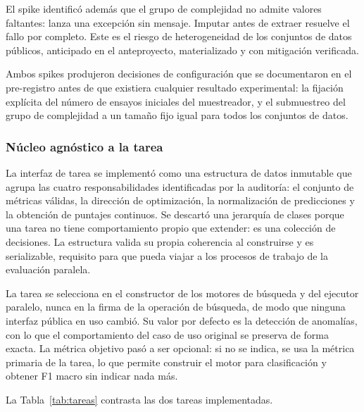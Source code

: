 \documentclass[12pt,letterpaper,oneside]{article}
\begin{document}
El spike identificó además que el grupo de complejidad no admite valores faltantes: lanza
una excepción sin mensaje. Imputar antes de extraer resuelve el fallo por completo. Este es
el riesgo de heterogeneidad de los conjuntos de datos públicos, anticipado en el
anteproyecto, materializado y con mitigación verificada.

Ambos spikes produjeron decisiones de configuración que se documentaron en el pre-registro
antes de que existiera cualquier resultado experimental: la fijación explícita del número de
ensayos iniciales del muestreador, y el submuestreo del grupo de complejidad a un tamaño fijo
igual para todos los conjuntos de datos.

\subsubsection{Núcleo agnóstico a la tarea}

La interfaz de tarea se implementó como una estructura de datos inmutable que agrupa las
cuatro responsabilidades identificadas por la auditoría: el conjunto de métricas válidas, la
dirección de optimización, la normalización de predicciones y la obtención de puntajes
continuos. Se descartó una jerarquía de clases porque una tarea no tiene comportamiento
propio que extender: es una colección de decisiones. La estructura valida su propia
coherencia al construirse y es serializable, requisito para que pueda viajar a los procesos
de trabajo de la evaluación paralela.

La tarea se selecciona en el constructor de los motores de búsqueda y del ejecutor paralelo,
nunca en la firma de la operación de búsqueda, de modo que ninguna interfaz pública en uso
cambió. Su valor por defecto es la detección de anomalías, con lo que el comportamiento del
caso de uso original se preserva de forma exacta. La métrica objetivo pasó a ser opcional: si
no se indica, se usa la métrica primaria de la tarea, lo que permite construir el motor para
clasificación y obtener F1 macro sin indicar nada más.

La Tabla~\ref{tab:tareas} contrasta las dos tareas implementadas.
\end{document}
